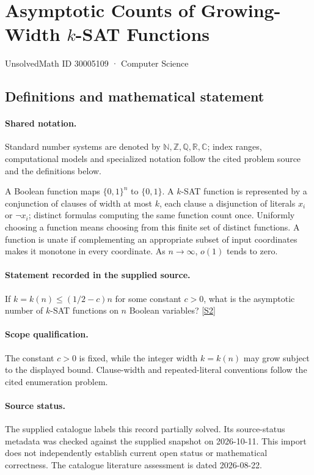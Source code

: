\documentclass[11pt]{article}
\newcommand{\sref}[2]{\hyperlink{source:#1:#2}{[S#2]}}
\begin{document}
\setcounter{section}{30005108}
\section{Asymptotic Counts of Growing-Width $k$-SAT Functions}\label{30005109}
{\small\sffamily UnsolvedMath ID 30005109 · Computer Science}
\subsection{Definitions and mathematical statement}

\paragraph{Shared notation.}Standard number systems are denoted by $\mathbb N,\mathbb Z,\mathbb Q,\mathbb R,\mathbb C$; index ranges, computational models and specialized notation follow the cited problem source and the definitions below.


A Boolean function maps $\{0,1\}^n$ to $\{0,1\}$. A $k$-SAT function is represented by a conjunction of clauses of width at most $k$, each clause a disjunction of literals $x_i$ or $\neg x_i$; distinct formulas computing the same function count once. Uniformly choosing a function means choosing from this finite set of distinct functions. A function is unate if complementing an appropriate subset of input coordinates makes it monotone in every coordinate. As $n\to\infty$, $o(1)$ tends to zero.
\paragraph{Statement recorded in the supplied source.}
If $k=k(n)\leq(1/2-c)n$ for some constant $c>0$, what is the asymptotic number of $k$-SAT functions on $n$ Boolean variables? \sref{30005109}{2}
\paragraph{Scope qualification.}
The constant $c>0$ is fixed, while the integer width $k=k(n)$ may grow subject to the displayed bound. Clause-width and repeated-literal conventions follow the cited enumeration problem.
\paragraph{Source status.}
The supplied catalogue labels this record partially solved. Its source-status metadata was checked against the supplied snapshot on 2026-10-11. This import does not independently establish current open status or mathematical correctness. The catalogue literature assessment is dated 2026-08-22.
\end{document}

